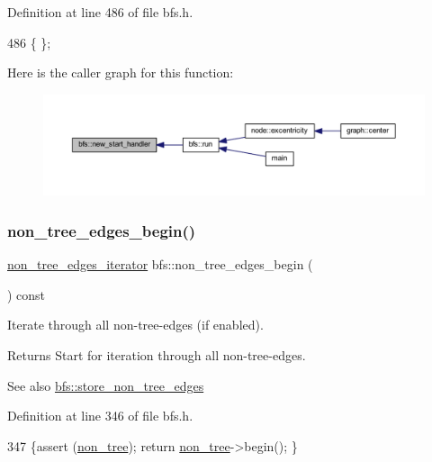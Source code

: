 Definition at line 486 of file bfs.\+h.


\begin{DoxyCode}
486 \{ \};
\end{DoxyCode}
Here is the caller graph for this function\+:
\nopagebreak
\begin{figure}[H]
\begin{center}
\leavevmode
\includegraphics[width=350pt]{classbfs_ab89a3d1cb36b20a86837b0345063e4b1_icgraph}
\end{center}
\end{figure}
\mbox{\label{classbfs_a06d02d2643f184b4c086678771f0ff90}} 
\subsubsection{\texorpdfstring{non\+\_\+tree\+\_\+edges\+\_\+begin()}{non\_tree\_edges\_begin()}}
{\footnotesize\ttfamily \mbox{\hyperlink{classbfs_a89ec32919076618d9eef18990fef543f}{non\+\_\+tree\+\_\+edges\+\_\+iterator}} bfs\+::non\+\_\+tree\+\_\+edges\+\_\+begin (\begin{DoxyParamCaption}{ }\end{DoxyParamCaption}) const\hspace{0.3cm}{\ttfamily [inline]}}



Iterate through all non-\/tree-\/edges (if enabled). 

\begin{DoxyReturn}{Returns}
Start for iteration through all non-\/tree-\/edges. 
\end{DoxyReturn}
\begin{DoxySeeAlso}{See also}
\mbox{\hyperlink{classbfs_a7de47b820fb9532f497660f767c9457f}{bfs\+::store\+\_\+non\+\_\+tree\+\_\+edges}} 
\end{DoxySeeAlso}


Definition at line 346 of file bfs.\+h.


\begin{DoxyCode}
347     \{assert (\mbox{\hyperlink{classbfs_a056b2131db11e62eb8f41c8dcc117d2e}{non\_tree}});  \textcolor{keywordflow}{return} \mbox{\hyperlink{classbfs_a056b2131db11e62eb8f41c8dcc117d2e}{non\_tree}}->begin(); \}
\end{DoxyCode}
\mbox{\label{classbfs_a9fb470cd36eb487004ca28c1723cabda}} 

